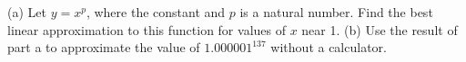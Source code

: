 (a) Let $y=x^p$, where the constant and $p$ is a natural number.
Find the best linear approximation to this function for values of
$x$ near 1.\answercheck\hwendpart
(b) Use the result of part a to approximate the value of
$1.000001^{137}$ without a calculator.\answercheck\hwendpart
